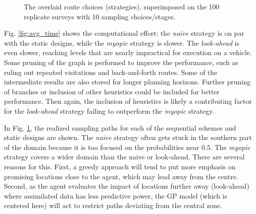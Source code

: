 \documentclass[aoas]{imsart}
\begin{document}
\begin{figure}[!b]
  \hfill
  \caption{The overlaid route choices (strategies), superimposed on
    the 100 replicate surveys with 10 sampling choices/stages. }
\label{fig:route_choices}
\end{figure}

Fig. \ref{fig:avg_time} shows the computational effort: the
\textit{naive} strategy is on par with the static designs, while the
\textit{myopic} strategy is slower. The \textit{look-ahead} is even
slower, reaching levels that are nearly impractical for execution on a
vehicle. Some pruning of the graph is performed to improve the
performance, such as ruling out repeated visitations and
back-and-forth routes. Some of the intermediate results are also
stored for longer planning horizons. Further pruning of branches or
inclusion of other heuristics could be included for better
performance. Then again, the inclusion of heuristics is likely a
contributing factor for the \textit{look-ahead} strategy failing to
outperform the \textit{myopic} strategy.

In Fig. \ref{fig:route_choices}, the realized sampling paths for each
of the sequential schemes and static designs are shown. The
\textit{naive} strategy often gets stuck in the southern part of the
domain because it is too focused on the probabilities near $0.5$. The
\textit{myopic} strategy covers a wider domain than the naive or
look-ahead. There are several reasons for this. First, a greedy
approach will tend to put more emphasis on promising locations close
to the agent, which may lead away from the centre. Second, as the
agent evaluates the impact of locations further away (look-ahead)
where assimilated data has less predictive power, the GP model (which
is centered here) will act to restrict paths deviating from the
central zone.
\end{document}

